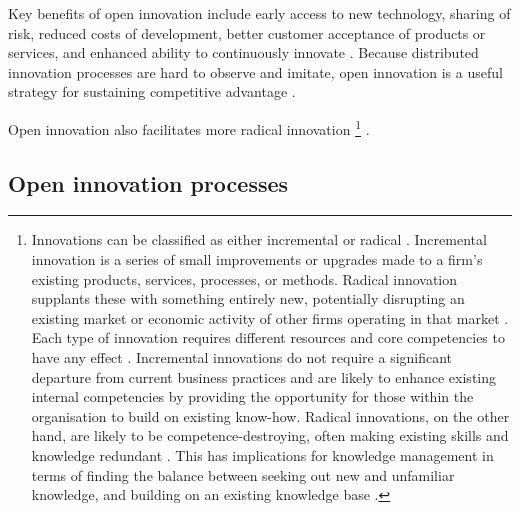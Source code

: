 Key benefits of open innovation include early access to new technology, sharing of risk, reduced costs of development, better customer acceptance of products or services, and enhanced ability to continuously innovate \citep{ye2013exploring}. Because distributed innovation processes are hard to observe and imitate, open innovation is a useful strategy for sustaining competitive advantage \citep{barney1991firm,lichtenthaler2011open}. \medskip

Open innovation also facilitates more radical innovation \footnote{Innovations can be classified as either incremental or radical \citep{henderson1990architectural}. Incremental innovation is a series of small improvements or upgrades made to a firm's existing products, services, processes, or methods. Radical innovation supplants these with something entirely new, potentially disrupting an existing market or economic activity of other firms operating in that market \citep{leifer2001implementing,mcdermott2002managing}. Each type of innovation requires different resources and core competencies to have any effect \citep{lam2000tacit,darroch2002examining}. Incremental innovations do not require a significant departure from current business practices and are likely to enhance existing internal competencies by providing the opportunity for those within the organisation to build on existing know-how. Radical innovations, on the other hand, are likely to be competence-destroying, often making existing skills and knowledge redundant \citep{tushman1986technological}. This has implications for knowledge management in terms of finding the balance between seeking out new and unfamiliar knowledge, and building on an existing knowledge base \citep{march1991exploration}.} \citep{inauen2012fostering,engen2014radical}.\medskip




\subsection{Open innovation processes}


